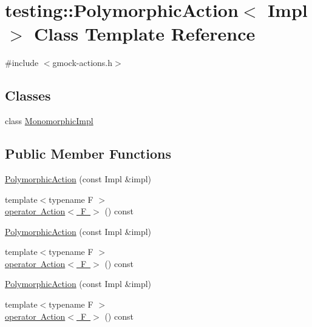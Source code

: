 \hypertarget{classtesting_1_1_polymorphic_action}{}\section{testing\+::Polymorphic\+Action$<$ Impl $>$ Class Template Reference}
\label{classtesting_1_1_polymorphic_action}


{\ttfamily \#include $<$gmock-\/actions.\+h$>$}

\subsection*{Classes}
\begin{DoxyCompactItemize}
\item 
class \mbox{\hyperlink{classtesting_1_1_polymorphic_action_1_1_monomorphic_impl}{Monomorphic\+Impl}}
\end{DoxyCompactItemize}
\subsection*{Public Member Functions}
\begin{DoxyCompactItemize}
\item 
\mbox{\hyperlink{classtesting_1_1_polymorphic_action_a062e5a45ad61dcf8085b15cc882ca0ae}{Polymorphic\+Action}} (const Impl \&impl)
\item 
{\footnotesize template$<$typename F $>$ }\\\mbox{\hyperlink{classtesting_1_1_polymorphic_action_ac35461616cc15c06f1a2f9ee1c03fb8f}{operator Action$<$ F $>$}} () const
\item 
\mbox{\hyperlink{classtesting_1_1_polymorphic_action_a062e5a45ad61dcf8085b15cc882ca0ae}{Polymorphic\+Action}} (const Impl \&impl)
\item 
{\footnotesize template$<$typename F $>$ }\\\mbox{\hyperlink{classtesting_1_1_polymorphic_action_ac35461616cc15c06f1a2f9ee1c03fb8f}{operator Action$<$ F $>$}} () const
\item 
\mbox{\hyperlink{classtesting_1_1_polymorphic_action_a062e5a45ad61dcf8085b15cc882ca0ae}{Polymorphic\+Action}} (const Impl \&impl)
\item 
{\footnotesize template$<$typename F $>$ }\\\mbox{\hyperlink{classtesting_1_1_polymorphic_action_ac35461616cc15c06f1a2f9ee1c03fb8f}{operator Action$<$ F $>$}} () const
\end{DoxyCompactItemize}
